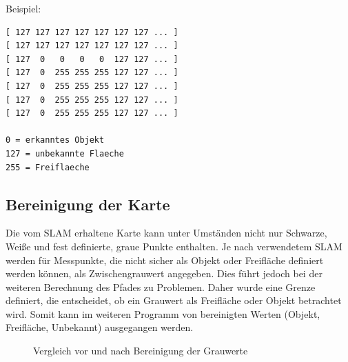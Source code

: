 \vspace{0.5cm}

Beispiel: 
\begin{lstlisting}
[ 127 127 127 127 127 127 127 ... ]
[ 127 127 127 127 127 127 127 ... ]
[ 127  0   0   0   0  127 127 ... ]
[ 127  0  255 255 255 127 127 ... ]
[ 127  0  255 255 255 127 127 ... ]
[ 127  0  255 255 255 127 127 ... ]
[ 127  0  255 255 255 127 127 ... ]

0 = erkanntes Objekt
127 = unbekannte Flaeche
255 = Freiflaeche
\end{lstlisting}


\subsection{Bereinigung der Karte}

Die vom SLAM erhaltene Karte kann unter Umständen nicht nur Schwarze, Weiße und fest definierte, graue Punkte enthalten. Je nach verwendetem SLAM werden für Messpunkte, die nicht sicher als Objekt oder Freifläche definiert werden können, als Zwischengrauwert angegeben. Dies führt jedoch bei der weiteren Berechnung des Pfades zu Problemen. Daher wurde eine Grenze definiert, die entscheidet, ob ein Grauwert als Freifläche oder Objekt betrachtet wird. Somit kann im weiteren Programm von bereinigten Werten (Objekt, Freifläche, Unbekannt) ausgegangen werden. 

\begin{figure}
\caption{Vergleich vor und nach Bereinigung der Grauwerte}
\label{fig:ungenaueKarte}
\end{figure}


